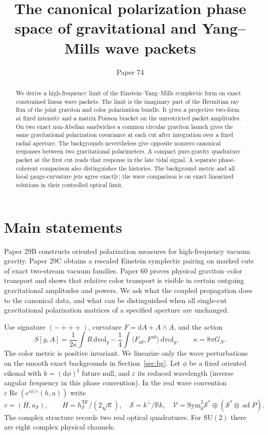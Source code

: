 \documentclass[11pt]{article}
\title{The canonical polarization phase space of gravitational and Yang--Mills wave packets}
\author{}
\date{Paper 74}
\newcommand{\dd}{\mathrm d}
\newcommand{\eps}{\varepsilon}
\newcommand{\re}{\operatorname{Re}}
\newcommand{\TF}{\mathrm{TF}}
\begin{document}
\maketitle
\begin{abstract}
We derive a high-frequency limit of the Einstein--Yang--Mills
symplectic form on exact constrained linear wave packets. The
limit is the imaginary part of the Hermitian ray flux of the
joint graviton and color polarization bundle. It gives a
projective two-form at fixed intensity and a matrix Poisson
bracket on the unrestricted packet amplitudes. On two exact
non-Abelian sandwiches a common circular graviton launch gives
the same gravitational polarization covariance at each cut
after integration over a fixed radial aperture. The backgrounds
nevertheless give opposite nonzero canonical responses between
two gravitational polarimeters. A compact pure-gravity
quadrature packet at the first cut reads that response in the
late tidal signal. A separate phase-coherent comparison also
distinguishes the histories. The background metric and all
local gauge-curvature jets agree exactly; the wave comparison
is on exact linearized solutions in their controlled optical
limit.
\end{abstract}

\section{Main statements}
Paper 29B \cite{p29b} constructs oriented polarization measures
for high-frequency vacuum gravity. Paper 29C \cite{p29c}
obtains a rescaled Einstein symplectic pairing on marked cuts of
exact two-stream vacuum families. Paper 60 \cite{p60} proves
physical graviton--color transport and shows that relative
color transport is visible in certain outgoing gravitational
amplitudes and powers. We ask what the coupled propagation does
to the canonical data, and what can be distinguished when all
single-cut gravitational polarization matrices of a specified
aperture are unchanged.

Use signature \((-+++)\), curvature \(F=\dd A+A\wedge A\), and
the action
\[
 S[g,A]=\frac1{2\kappa}\int R\,\dd\mathrm{vol}_g
        -\frac14\int\langle F_{ab},F^{ab}\rangle\,\dd\mathrm{vol}_g,
 \qquad \kappa=8\pi G_N.
\]
The color metric is positive invariant. We linearize only the
wave perturbations on the smooth exact backgrounds in
Section~\ref{sec:bg}. Let \(\phi\) be a fixed oriented eikonal
with \(k=(\dd\phi)^\sharp\) future null, and \(\eps\) its
reduced wavelength (inverse angular frequency in this phase
convention). In the real wave convention
\(\eps\re(e^{i\phi/\eps}(h,a))\) write
\[
 v=(H,a_\mathcal S), \qquad
 H=h_\mathcal S^\TF/(2\sqrt\kappa),\quad
 \mathcal S=k^\perp/\mathbb R k,\quad
 \mathcal V=\mathrm{Sym}^2_0\mathcal S^*
        \oplus(\mathcal S^*\otimes\operatorname{ad}P).
\]
The complex structure records two real optical quadratures. For
\(\mathrm{SU}(2)\) there are eight complex physical channels.
\end{document}
